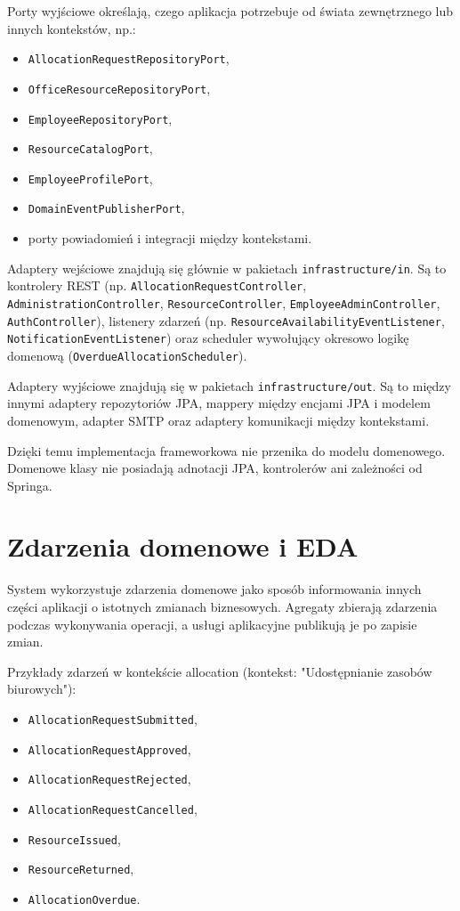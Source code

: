 Porty wyjściowe określają, czego aplikacja potrzebuje od świata zewnętrznego lub innych kontekstów, np.:
\begin{itemize}
    \item \texttt{AllocationRequestRepositoryPort},
    \item \texttt{OfficeResourceRepositoryPort},
    \item \texttt{EmployeeRepositoryPort},
    \item \texttt{ResourceCatalogPort},
    \item \texttt{EmployeeProfilePort},
    \item \texttt{DomainEventPublisherPort},
    \item porty powiadomień i integracji między kontekstami.
\end{itemize}

Adaptery wejściowe znajdują się głównie w pakietach \texttt{infrastructure/in}. Są to kontrolery REST (np. \texttt{AllocationRequestController}, \texttt{AdministrationController}, \texttt{ResourceController}, \texttt{EmployeeAdminController}, \texttt{AuthController}), listenery zdarzeń (np. \texttt{ResourceAvailabilityEventListener}, \texttt{NotificationEventListener}) oraz scheduler wywołujący okresowo logikę domenową (\texttt{OverdueAllocationScheduler}).

Adaptery wyjściowe znajdują się w pakietach \texttt{infrastructure/out}. Są to między innymi adaptery repozytoriów JPA, mappery między encjami JPA i modelem domenowym, adapter SMTP oraz adaptery komunikacji między kontekstami.

Dzięki temu implementacja frameworkowa nie przenika do modelu domenowego. Domenowe klasy nie posiadają adnotacji JPA, kontrolerów ani zależności od Springa.

\section{Zdarzenia domenowe i EDA}

System wykorzystuje zdarzenia domenowe jako sposób informowania innych części aplikacji o istotnych zmianach biznesowych. Agregaty zbierają zdarzenia podczas wykonywania operacji, a usługi aplikacyjne publikują je po zapisie zmian.

Przykłady zdarzeń w kontekście allocation (kontekst: "Udostępnianie zasobów biurowych"):
\begin{itemize}
    \item \texttt{AllocationRequestSubmitted},
    \item \texttt{AllocationRequestApproved},
    \item \texttt{AllocationRequestRejected},
    \item \texttt{AllocationRequestCancelled},
    \item \texttt{ResourceIssued},
    \item \texttt{ResourceReturned},
    \item \texttt{AllocationOverdue}.
\end{itemize}

